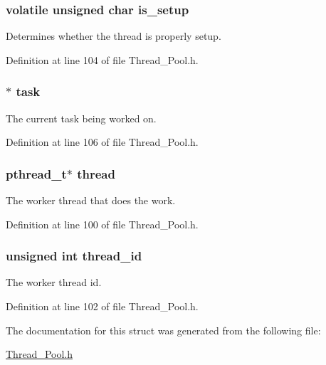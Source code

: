 \subsubsection[{is\+\_\+setup}]{\setlength{\rightskip}{0pt plus 5cm}volatile unsigned char is\+\_\+setup}\label{struct_worker_ae294086f45f8af167507131a38e07873}


Determines whether the thread is properly setup. 



Definition at line 104 of file Thread\+\_\+\+Pool.\+h.

\hypertarget{struct_worker_adac025b94121ea5ab5dd2a3a715ca778}{}
\subsubsection[{task}]{$\ast$ task}\label{struct_worker_adac025b94121ea5ab5dd2a3a715ca778}


The current task being worked on. 



Definition at line 106 of file Thread\+\_\+\+Pool.\+h.

\hypertarget{struct_worker_a6b67ec3785df1f36469a10e68b64ab6f}{}
\subsubsection[{thread}]{\setlength{\rightskip}{0pt plus 5cm}pthread\+\_\+t$\ast$ thread}\label{struct_worker_a6b67ec3785df1f36469a10e68b64ab6f}


The worker thread that does the work. 



Definition at line 100 of file Thread\+\_\+\+Pool.\+h.

\hypertarget{struct_worker_a720bccae6839fa7ee8161f77f337fc15}{}
\subsubsection[{thread\+\_\+id}]{\setlength{\rightskip}{0pt plus 5cm}unsigned int thread\+\_\+id}\label{struct_worker_a720bccae6839fa7ee8161f77f337fc15}


The worker thread id. 



Definition at line 102 of file Thread\+\_\+\+Pool.\+h.



The documentation for this struct was generated from the following file\+:\begin{DoxyCompactItemize}
\item 
\hyperlink{_thread___pool_8h}{Thread\+\_\+\+Pool.\+h}\end{DoxyCompactItemize}
